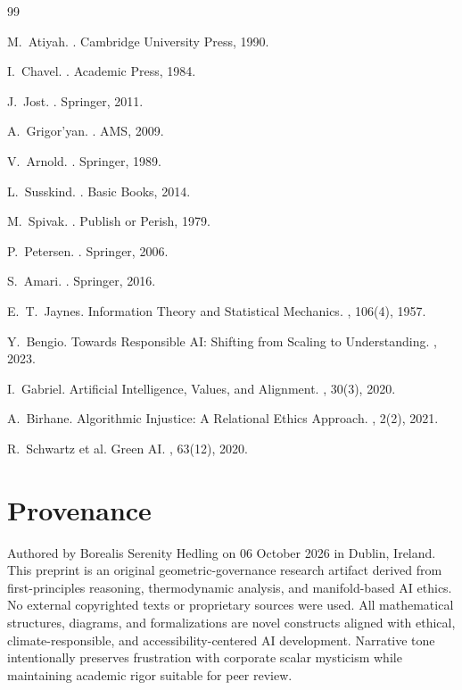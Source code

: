 \documentclass[11pt]{article}
\begin{document}
\begin{thebibliography}{99}

M.~Atiyah.
.
\newblock Cambridge University Press, 1990.

I.~Chavel.
.
\newblock Academic Press, 1984.

J.~Jost.
.
\newblock Springer, 2011.

A.~Grigor'yan.
.
\newblock AMS, 2009.

V.~Arnold.
.
\newblock Springer, 1989.

L.~Susskind.
.
\newblock Basic Books, 2014.

M.~Spivak.
.
\newblock Publish or Perish, 1979.

P.~Petersen.
.
\newblock Springer, 2006.

S.~Amari.
.
\newblock Springer, 2016.

E.~T.~Jaynes.
\newblock Information Theory and Statistical Mechanics.
, 106(4), 1957.

Y.~Bengio.
\newblock Towards Responsible AI: Shifting from Scaling to Understanding.
, 2023.

I.~Gabriel.
\newblock Artificial Intelligence, Values, and Alignment.
, 30(3), 2020.

A.~Birhane.
\newblock Algorithmic Injustice: A Relational Ethics Approach.
, 2(2), 2021.

R.~Schwartz et al.
\newblock Green AI.
, 63(12), 2020.

\end{thebibliography}

\section*{Provenance}

Authored by Borealis Serenity Hedling on 06 October 2026 in Dublin, Ireland.  
This preprint is an original geometric-governance research artifact derived from
first-principles reasoning, thermodynamic analysis, and manifold-based AI ethics.
No external copyrighted texts or proprietary sources were used. All mathematical
structures, diagrams, and formalizations are novel constructs aligned with ethical,
climate-responsible, and accessibility-centered AI development. Narrative tone
intentionally preserves frustration with corporate scalar mysticism while maintaining
academic rigor suitable for peer review.
\end{document}
